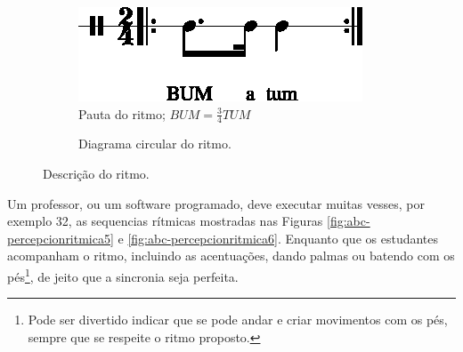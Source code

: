 \begin{figure}[H]
\centering
     \begin{subfigure}[c]{0.45\textwidth}
         \centering
         \includegraphics[width=\textwidth]{chapters/cap-musicalidade-percepcion/treino-ritmo4-1.eps}
         \caption{Pauta do ritmo; $BUM=\frac{3}{4}TUM$}
         \label{fig:RitmoTUMatum1}
     \end{subfigure}
     \hfill
     \begin{subfigure}[c]{0.45\textwidth}
         \centering
{}
         \caption{Diagrama circular do ritmo.}
         \label{fig:RitmoTUMatum2}
     \end{subfigure}
\caption{Descrição do ritmo.}
\label{fig:abc-percepcionritmica4}
\end{figure}

\begin{example}
Um professor, ou um software programado, 
deve executar muitas vesses, por exemplo 32, 
as sequencias rítmicas mostradas nas Figuras 
\ref{fig:abc-percepcionritmica5} e \ref{fig:abc-percepcionritmica6}.
Enquanto que os estudantes acompanham o ritmo, 
incluindo as acentuações, dando palmas ou batendo com os pés\footnote{Pode
ser divertido indicar que se pode andar e criar movimentos com os pés, 
sempre que se respeite o ritmo proposto.},
de jeito que a sincronia seja perfeita.
\end{example}

